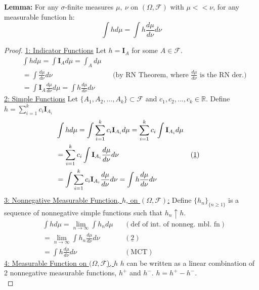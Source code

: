 \documentclass[12pt,letterpaper, onecolumn]{exam}
\newcommand{\real}{\mathbb{R}}
\newcommand{\I}{\mathbf{I}}
\newcommand{\calF}{\mathcal{F}}
\begin{document}
\begin{questions}
    \begin{solution}
    \textbf{Lemma:} For any $\sigma$-finite measures $\mu, \: \nu$ on $(\Omega, \calF)$ with $\mu << \nu$, for any measurable function h: 
            $$\int h d\mu = \int h \frac{d\mu}{d\nu}d\nu$$
            \begin{proof}
                \underline{1: Indicator Functions} Let $h = \I_{A}$ for some $A \in \calF$. \\
                \begin{align*}
                    & \int h d\mu = \int \I_A d\mu = \int_A d\mu \\
                    & = \int \frac{d\mu}{d\nu}d\nu && \textrm{(by RN Theorem, where $\tfrac{d \mu}{d \nu}$ is the RN der.)}  \\
                    & = \int \I_A \frac{d\mu}{d\nu}d\mu = \int h \frac{d\mu}{d\nu}d\nu
                \end{align*}
                \underline{2: Simple Functions} Let $\{A_1, A_2, ... , A_k\} \subset \calF$ and $c_1, c_2, ... , c_k \in \real$. Define $h = \sum_{i = 1}^k c_i \I_{A_i}$
                \begin{align*}
                    & \int h d\mu = \int \sum_{i = 1}^k c_i\I_{A_i} d\mu = \sum_{i = 1}^k c_i \int \I_{A_i} d\mu \\
                    & = \sum_{i = 1}^k c_i \int \I_{A_i} \frac{d\mu}{d\nu}d\nu && \textrm{(\underline{1})}  \\
                    & = \int \sum_{i = 1}^k c_i \I_{A_i} \frac{d\mu}{d\nu}d\nu = \int h \frac{d\mu}{d\nu}d\nu
                \end{align*}
                \underline{3: Nonnegative Measurable Function, $h$, on $(\Omega, \calF)$:} Define $\{h_n\}_{\{n \geq 1\}}$ is a sequence of nonnegative simple functions such that $h_n \uparrow h$. 
                \begin{align*}
                    & \int h d\mu = \lim_{n \to \infty} \int h_n d\mu && (\textrm{def of int. of nonneg. mbl. fn}) \\
                    & = \lim_{n \to \infty} \int h_n \frac{d \mu}{d \nu}d\nu && (\underline{2}) \\
                    & = \int h \frac{d \mu}{d \nu}d\nu && (\textrm{MCT})
                \end{align*}
                \underline{4: Measurable Function on $(\Omega, \calF$), $h$} $h$ can be written as a linear combination of 2 nonnegative measurable functions, $h^+$ and $h^-$. $h = h^+ - h^-$. \\

\end{proof}
\end{solution}
\end{questions}
\end{document}
